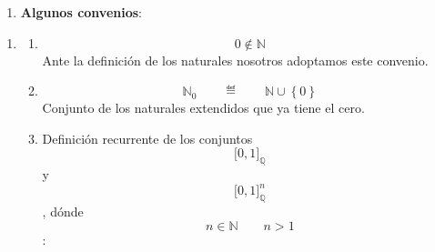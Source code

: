 \begin{enumerate}
\def\labelenumi{\arabic{enumi}.}
\tightlist
\item
  \textbf{Algunos convenios}:
\end{enumerate}

\begin{enumerate}
\def\labelenumi{\arabic{enumi}.}
\item
  \begin{enumerate}
  \def\labelenumii{\arabic{enumii}.}
  \item
    \[0 \notin {\mathbb{N}}\]Ante la definición de los naturales
    nosotros adoptamos este convenio.
  \item
    \[{\mathbb{N}}_{0}{\qquad ≝ \qquad}{{\mathbb{N}} \cup \left\{ 0 \right\}}\]Conjunto
    de los naturales extendidos que ya tiene el cero.
  \item
    Definición recurrente de los
    conjuntos\[\lbrack 0,1\rbrack_{\mathbb{Q}}\]y\[\lbrack 0,1\rbrack_{\mathbb{Q}}^{n}\],
    dónde \[{n \in {\mathbb{N}}}\qquad{n > 1}\]:


\end{enumerate}
\end{enumerate}
